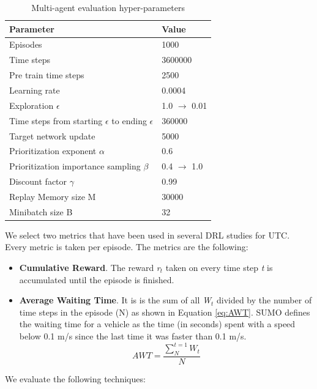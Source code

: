 \documentclass{llncs}
\begin{document}
\begin{table}
\centering
\caption{Multi-agent evaluation hyper-parameters}
 \begin{tabularx}{\columnwidth}{X|X}
 \hline
 Parameter & Value \\ [0.5ex] 
 \hline
 \hline
 Episodes & 1000 \\
 Time steps & 3600000 \\
 Pre train time steps & 2500 \\
 Learning rate & 0.0004 \\
 Exploration $\epsilon$ & 1.0 $\rightarrow$ 0.01 \\
 Time steps from starting $\epsilon$ to ending $\epsilon$ & 360000 \\
 Target network update & 5000 \\
 Prioritization exponent $\alpha$ & 0.6 \\
 Prioritization importance sampling $\beta$ & 0.4 $\rightarrow$ 1.0 \\
 Discount factor $\gamma$ & 0.99 \\
 Replay Memory size M & 30000 \\
 Minibatch size B & 32 \\
 \hline
\end{tabularx}
\label{tab:MARLhyp}
\end{table}

We select two metrics that have been used in several DRL studies for UTC. Every metric is taken per episode. The metrics are the following:

\begin{itemize}
	\item \textbf{Cumulative Reward}. The reward \textit{r$_{t}$} taken on every time step \textit{t} is accumulated until the episode is finished.
	
	\item \textbf{Average Waiting Time}. It is is the sum of all \textit{W$_{t}$} divided by the number of time steps in the episode (N) as shown in Equation \ref{eq:AWT}. SUMO defines the waiting time for a vehicle as the time (in seconds) spent with a speed below 0.1 m/s since the last time it was faster than 0.1 m/s.
\begin{equation}\label{eq:AWT}
AWT = \frac{\sum^{t=1}_{N}{W_{t}}}{N}
\end{equation}
\end{itemize}

We evaluate the following techniques:
\end{document}
